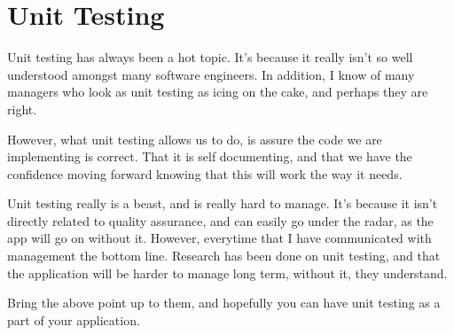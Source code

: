 \maketitle{}
\section{ Unit Testing }

Unit testing has always been a hot topic. It's because it really isn't so well
understood amongst many software engineers. In addition, I know of many managers
who look as unit testing as icing on the cake, and perhaps they are right.

However, what unit testing allows us to do, is assure the code we are implementing
is correct. That it is self documenting, and that we have the confidence moving
forward knowing that this will work the way it needs.

Unit testing really is a beast, and is really hard to manage. It's because it
isn't directly related to quality assurance, and can easily go under the radar,
as the app will go on without it. However, everytime that I have communicated
with management the bottom line. Research has been done on unit testing, and that
the application will be harder to manage long term, without it, they understand.

Bring the above point up to them, and hopefully you can have unit testing as a
part of your application.
